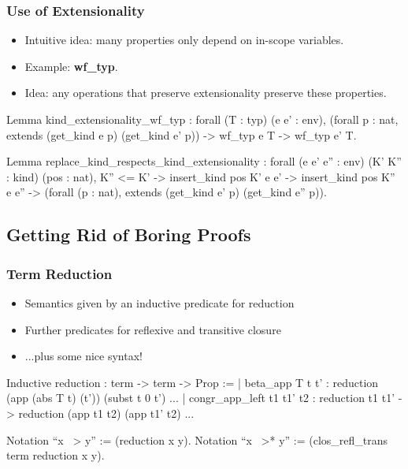 \documentclass{beamer}
\begin{document}
\begin{frame}[fragile]
\frametitle{Use of Extensionality}
\begin{itemize}
  \item Intuitive idea: many properties only depend on in-scope variables.
  \item Example: \textbf{wf\_typ}.
  \item Idea: any operations that preserve extensionality preserve these properties.
\end{itemize}

\begin{pyglist}[fontsize=\scriptsize]
  Lemma kind_extensionality_wf_typ :
    forall (T : typ) (e e' : env),
      (forall p : nat, extends (get_kind e p) (get_kind e' p)) -> 
      wf_typ e T -> wf_typ e' T.
      
  Lemma replace_kind_respects_kind_extensionality :
    forall (e e' e'' : env) (K' K'' : kind) (pos : nat),
      K'' <= K' ->
      insert_kind pos K' e e' ->
      insert_kind pos K'' e e'' ->
      (forall (p : nat), extends (get_kind e' p) (get_kind e'' p)).
\end{pyglist}
\end{frame}

\subsection{Getting Rid of Boring Proofs}

\begin{frame}[fragile]
\frametitle{Term Reduction}
\begin{itemize}
  \item Semantics given by an inductive predicate for reduction
  \item Further predicates for reflexive and transitive closure
  \item ...plus some nice syntax!
\end{itemize}

\begin{pyglist}[fontsize=\scriptsize]
Inductive reduction : term -> term -> Prop :=
| beta_app T t t' :
    reduction (app (abs T t) (t')) (subst t 0 t')
...
| congr_app_left t1 t1' t2 :
    reduction t1 t1' ->
    reduction (app t1 t2) (app t1' t2)
...
    
Notation ``x ~> y'' := (reduction x y).
Notation ``x ~>* y'' := (clos_refl_trans term reduction x y).
\end{pyglist}
\end{frame}
\end{document}
